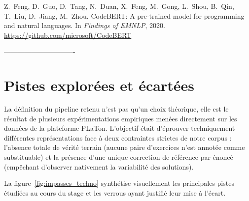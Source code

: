  Z.~Feng, D.~Guo, D.~Tang, N.~Duan, X.~Feng, M.~Gong, L.~Shou, B.~Qin, T.~Liu, D.~Jiang, M.~Zhou. \newblock CodeBERT: A pre-trained model for programming and natural languages. \newblock In \emph{Findings of EMNLP}, 2020. \newblock \url{https://github.com/microsoft/CodeBERT}
\fi



-------------------------------


\section{Pistes explorées et écartées}

La définition du pipeline retenu n'est pas qu'un choix théorique, elle est le résultat de plusieurs expérimentations empiriques menées directement sur les données de la plateforme PLaTon. L'objectif était d'éprouver techniquement différentes représentations face à deux contraintes strictes de notre corpus : l'absence totale de vérité terrain (aucune paire d'exercices n'est annotée comme substituable) et la présence d'une unique correction de référence par énoncé (empêchant d'observer nativement la variabilité des solutions). 

La figure~\ref{fig:impasses_techno} synthétise visuellement les principales pistes étudiées au cours du stage et les verrous ayant justifié leur mise à l'écart.

